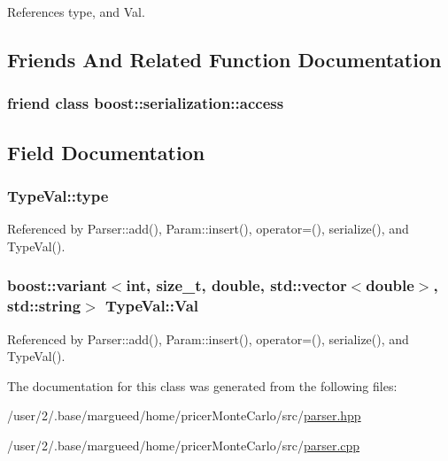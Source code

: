 References type, and Val.



\subsection{Friends And Related Function Documentation}
\hypertarget{classTypeVal_ac98d07dd8f7b70e16ccb9a01abf56b9c}{
\subsubsection[{boost\-::serialization\-::access}]{\setlength{\rightskip}{0pt plus 5cm}friend class boost\-::serialization\-::access\hspace{0.3cm}{\ttfamily [friend]}}}\label{classTypeVal_ac98d07dd8f7b70e16ccb9a01abf56b9c}


\subsection{Field Documentation}
\hypertarget{classTypeVal_abd5dd71d2a5e2ce2f3b1f018068108ff}{
\subsubsection[{type}]{ Type\-Val\-::type}}\label{classTypeVal_abd5dd71d2a5e2ce2f3b1f018068108ff}


Referenced by Parser\-::add(), Param\-::insert(), operator=(), serialize(), and Type\-Val().

\hypertarget{classTypeVal_abafd45e0ebbcb8129080cddbea3b3d7b}{
\subsubsection[{Val}]{\setlength{\rightskip}{0pt plus 5cm}boost\-::variant$<$int, size\-\_\-t, double, std\-::vector$<$double$>$, std\-::string$>$ Type\-Val\-::\-Val}}\label{classTypeVal_abafd45e0ebbcb8129080cddbea3b3d7b}


Referenced by Parser\-::add(), Param\-::insert(), operator=(), serialize(), and Type\-Val().



The documentation for this class was generated from the following files\-:\begin{DoxyCompactItemize}
\item 
/user/2/.\-base/margueed/home/pricer\-Monte\-Carlo/src/\hyperlink{parser_8hpp}{parser.\-hpp}\item 
/user/2/.\-base/margueed/home/pricer\-Monte\-Carlo/src/\hyperlink{parser_8cpp}{parser.\-cpp}\end{DoxyCompactItemize}
